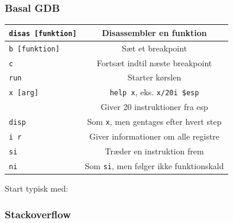 \documentclass[slidestop,compress,mathserif, xcolor=table]{beamer}
\begin{document}
\begin{frame}[c,volatile]
    \frametitle{Basal GDB}

    \begin{center}
    \begin{tabular}{|l|c|}
    \hline
    \texttt{disas [funktion]} & Disassembler en funktion \\\hline
    \texttt{b [funktion]}     & Sæt et breakpoint \\\hline
    \texttt{c}                & Fortsæt indtil næste breakpoint \\\hline
    \texttt{run}              & Starter kørslen \\\hline
    \texttt{x [arg]}          & \texttt{help x}, eks. \texttt{x/20i \$esp}\\
                              & Giver 20 instruktioner fra esp\\\hline
    \texttt{disp}             & Som \texttt{x}, men gentages efter hvert step
    \\\hline

    \texttt{i r}              & Giver informationer om alle registre\\\hline
    \texttt{si}               & Træder en instruktion frem\\\hline
    \texttt{ni}               & Som \texttt{si}, men følger ikke
    funktionskald\\\hline
    \end{tabular}
    \end{center}

    Start typisk med:
    
\end{frame}

\begin{frame}[c]
    \frametitle{Stackoverflow}
    \pause
    
\end{frame}
\end{document}
